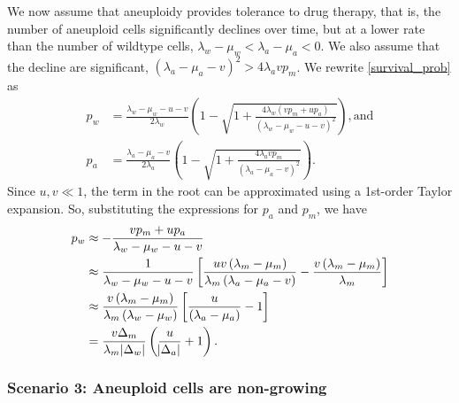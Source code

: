 \documentclass[12pt]{extarticle}
\begin{document}
\begin{appendices}
We now assume that aneuploidy provides tolerance to drug therapy, that is, the number of aneuploid cells significantly declines over time, but at a lower rate than the number of wildtype cells, $\lambda_w - \mu_w < \lambda_a - \mu_a < 0$. We also assume that the decline are significant, $\left(\lambda_a-\mu_a-v\right)^2 > 4\lambda_a v p_m$.
We rewrite \cref{survival_prob} as
\begin{equation}
\begin{aligned}
p_w&=\frac{\lambda_w-\mu_w-u-v}{2\lambda_w}\left(1-\sqrt{1+\frac{4\lambda_w\left(vp_m+up_a\right)}{\left(\lambda_w-\mu_w-u-v\right)^2}}\right) ,
\text{and} \\
p_a&=\frac{\lambda_a-\mu_a-v}{2\lambda_a}\left(1-\sqrt{1+\frac{4\lambda_avp_m}{\left(\lambda_a-\mu_a-v\right)^2}}\right) .
\end{aligned}
\end{equation}
Since $u,v\ll1$, the term in the root can be approximated using a 1st-order Taylor expansion. So, substituting the expressions for $p_a$ and $p_m$, we have
\begin{equation}\label{survprobwinitial}
\begin{aligned}
p_w&\approx-\frac{vp_m+up_a}{\lambda_w-\mu_w-u-v}\\
&\approx\frac{1}{\lambda_w-\mu_w-u-v}\left[\frac{uv\left(\lambda_m-\mu_m\right)}{\lambda_m\left(\lambda_a-\mu_a-v\right)}-\frac{v\left(\lambda_m-\mu_m\right)}{\lambda_m}\right]\\ %
&\approx\frac{v\left(\lambda_m-\mu_m\right)}{\lambda_m\left(\lambda_w-\mu_w\right)}\left[\frac{u}{\left(\lambda_a-\mu_a\right)}-1\right] \\
&=\frac{v\Delta_m}{\lambda_m \abs{\Delta_w}}\left(\frac{u}{\abs{\Delta_a}}+1\right) .
\end{aligned}
\end{equation}

\subsubsection*{Scenario 3: Aneuploid cells are non-growing} %


\end{appendices}
\end{document}
